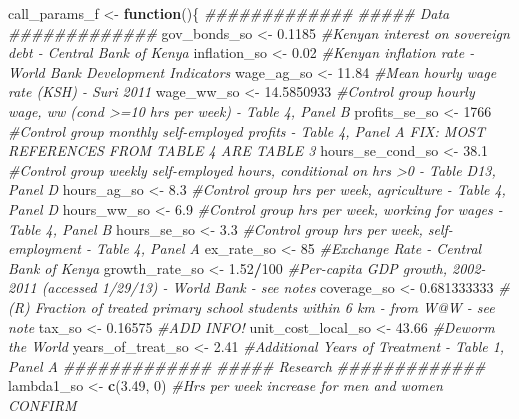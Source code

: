 \documentclass[]{article}
\newenvironment{Shaded}{\begin{snugshade}}{\end{snugshade}}
\newcommand{\CommentTok}[1]{\textcolor[rgb]{0.56,0.35,0.01}{\textit{#1}}}
\newcommand{\ControlFlowTok}[1]{\textcolor[rgb]{0.13,0.29,0.53}{\textbf{#1}}}
\newcommand{\DecValTok}[1]{\textcolor[rgb]{0.00,0.00,0.81}{#1}}
\newcommand{\FloatTok}[1]{\textcolor[rgb]{0.00,0.00,0.81}{#1}}
\newcommand{\KeywordTok}[1]{\textcolor[rgb]{0.13,0.29,0.53}{\textbf{#1}}}
\newcommand{\NormalTok}[1]{#1}
\newcommand{\OperatorTok}[1]{\textcolor[rgb]{0.81,0.36,0.00}{\textbf{#1}}}
\newcommand{\StringTok}[1]{\textcolor[rgb]{0.31,0.60,0.02}{#1}}
\begin{document}
\begin{Shaded}
\begin{Highlighting}[]
\NormalTok{call_params_f <-}\StringTok{ }\ControlFlowTok{function}\NormalTok{()\{}
    \CommentTok{#############}
    \CommentTok{##### Data  }
    \CommentTok{#############}
\NormalTok{    gov_bonds_so <-}\StringTok{     }\FloatTok{0.1185}       \CommentTok{#Kenyan interest on sovereign debt - Central Bank of Kenya}
\NormalTok{    inflation_so <-}\StringTok{  }\FloatTok{0.02}          \CommentTok{#Kenyan inflation rate - World Bank Development Indicators}
\NormalTok{    wage_ag_so <-}\StringTok{   }\FloatTok{11.84}            \CommentTok{#Mean hourly wage rate (KSH) - Suri 2011}
\NormalTok{    wage_ww_so <-}\StringTok{   }\FloatTok{14.5850933}     \CommentTok{#Control group hourly wage, ww (cond >=10 hrs per week) - Table 4, Panel B}
\NormalTok{    profits_se_so <-}\StringTok{ }\DecValTok{1766}          \CommentTok{#Control group monthly self-employed profits - Table 4, Panel A  FIX: MOST REFERENCES FROM TABLE 4 ARE TABLE 3}
\NormalTok{    hours_se_cond_so <-}\StringTok{ }\FloatTok{38.1}       \CommentTok{#Control group weekly self-employed hours, conditional on hrs >0 - Table D13, Panel D}
\NormalTok{    hours_ag_so <-}\StringTok{ }\FloatTok{8.3}             \CommentTok{#Control group hrs per week, agriculture - Table 4, Panel D}
\NormalTok{    hours_ww_so <-}\StringTok{ }\FloatTok{6.9}             \CommentTok{#Control group hrs per week, working for wages - Table 4, Panel B}
\NormalTok{    hours_se_so <-}\StringTok{ }\FloatTok{3.3}             \CommentTok{#Control group hrs per week, self-employment - Table 4, Panel A}
\NormalTok{    ex_rate_so <-}\StringTok{ }\DecValTok{85}               \CommentTok{#Exchange Rate - Central Bank of Kenya}
\NormalTok{    growth_rate_so <-}\StringTok{ }\FloatTok{1.52}\OperatorTok{/}\DecValTok{100}     \CommentTok{#Per-capita GDP growth, 2002-2011 (accessed 1/29/13) -   World Bank - see notes}
\NormalTok{    coverage_so  <-}\StringTok{ }\FloatTok{0.681333333}    \CommentTok{# (R) Fraction of treated primary school students within 6 km - from W@W - see note}
\NormalTok{    tax_so <-}\StringTok{ }\FloatTok{0.16575}              \CommentTok{#ADD INFO!}
\NormalTok{    unit_cost_local_so <-}\StringTok{ }\FloatTok{43.66}    \CommentTok{#Deworm the World}
\NormalTok{    years_of_treat_so <-}\StringTok{ }\FloatTok{2.41}      \CommentTok{#Additional Years of Treatment - Table 1, Panel A}
    \CommentTok{#############}
    \CommentTok{##### Research}
    \CommentTok{#############    }
\NormalTok{    lambda1_so <-}\StringTok{ }\KeywordTok{c}\NormalTok{(}\FloatTok{3.49}\NormalTok{, }\DecValTok{0}\NormalTok{)       }\CommentTok{#Hrs per week increase for men and women CONFIRM}

\end{Highlighting}
\end{Shaded}
\end{document}
